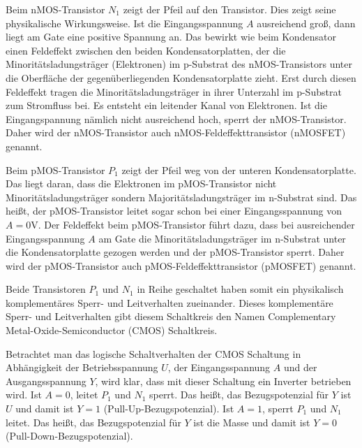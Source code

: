 \documentclass{scrarticle}
\numberwithin{equation}{section}
\begin{document}
Beim nMOS-Transistor $N_1$ zeigt der Pfeil auf den Transistor. Dies zeigt seine physikalische Wirkungsweise. Ist die Eingangsspannung $A$ ausreichend groß, dann liegt am Gate eine positive Spannung an. Das bewirkt wie beim Kondensator einen Feldeffekt zwischen den beiden Kondensatorplatten, der die Minoritätsladungsträger (Elektronen) im p-Substrat des nMOS-Transistors unter die Oberfläche der gegenüberliegenden Kondensatorplatte zieht. Erst durch diesen Feldeffekt tragen die Minoritätsladungsträger in ihrer Unterzahl im p-Substrat zum Stromfluss bei. Es entsteht ein leitender Kanal von Elektronen. Ist die Eingangspannung nämlich nicht ausreichend hoch, sperrt der nMOS-Transistor. Daher wird der nMOS-Transistor auch nMOS-Feldeffekttransistor (nMOSFET) genannt.

Beim pMOS-Transistor $P_1$ zeigt der Pfeil weg von der unteren Kondensatorplatte. Das liegt daran, dass die Elektronen im pMOS-Transistor nicht Minoritätsladungsträger sondern Majoritätsladungsträger im n-Substrat sind. Das heißt, der pMOS-Transistor leitet sogar schon bei einer Eingangsspannung von $A = 0\mathrm{V}$. Der Feldeffekt beim pMOS-Transistor führt dazu, dass bei ausreichender Eingangsspannung $A$ am Gate die Minoritätsladungsträger im n-Substrat unter die Kondensatorplatte gezogen werden und der pMOS-Transistor sperrt. Daher wird der pMOS-Transistor auch pMOS-Feldeffekttransistor (pMOSFET) genannt.

Beide Transistoren $P_1$ und $N_1$ in Reihe geschaltet haben somit ein physikalisch komplementäres Sperr- und Leitverhalten zueinander. Dieses komplementäre Sperr- und Leitverhalten gibt diesem Schaltkreis den Namen Complementary Metal-Oxide-Semiconductor (CMOS) Schaltkreis.

Betrachtet man das logische Schaltverhalten der CMOS Schaltung in Abhängigkeit der Betriebsspannung $U$, der Eingangsspannung $A$ und der Ausgangsspannung $Y$, wird klar, dass mit dieser Schaltung ein Inverter betrieben wird. Ist $A = 0$, leitet $P_1$ und $N_1$ sperrt. Das heißt, das Bezugspotenzial für $Y$ ist $U$ und damit ist $Y = 1$ (Pull-Up-Bezugspotenzial). Ist $A = 1$, sperrt $P_1$ und $N_1$ leitet. Das heißt, das Bezugspotenzial für $Y$ ist die Masse und damit ist $Y = 0$ (Pull-Down-Bezugspotenzial).
\end{document}
